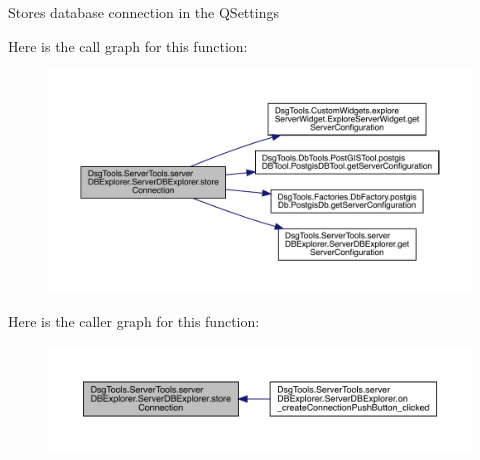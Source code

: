 \begin{DoxyVerb}Stores database connection in the QSettings
\end{DoxyVerb}
 Here is the call graph for this function\+:
\nopagebreak
\begin{figure}[H]
\begin{center}
\leavevmode
\includegraphics[width=350pt]{class_dsg_tools_1_1_server_tools_1_1server_d_b_explorer_1_1_server_d_b_explorer_a7aeedde826e8871d6b9d365a173b4916_cgraph}
\end{center}
\end{figure}
Here is the caller graph for this function\+:
\nopagebreak
\begin{figure}[H]
\begin{center}
\leavevmode
\includegraphics[width=350pt]{class_dsg_tools_1_1_server_tools_1_1server_d_b_explorer_1_1_server_d_b_explorer_a7aeedde826e8871d6b9d365a173b4916_icgraph}
\end{center}
\end{figure}
\mbox{\label{class_dsg_tools_1_1_server_tools_1_1server_d_b_explorer_1_1_server_d_b_explorer_acae0951876db614c0491d8e83be71bff}} 
